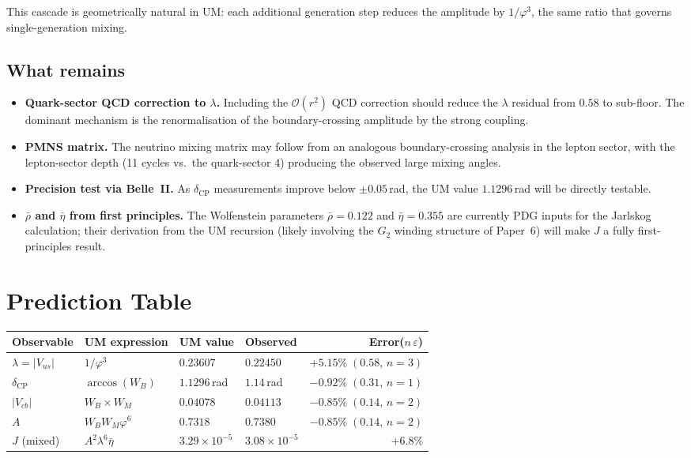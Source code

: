 \documentclass[12pt]{article}
\begin{document}
This cascade is geometrically natural in UM: each additional generation
step reduces the amplitude by $1/\varphi^3$, the same ratio that governs
single-generation mixing.

\subsection{What remains}

\begin{itemize}
  \item \textbf{Quark-sector QCD correction to $\lambda$.} Including the
        $\mathcal{O}(r^2)$ QCD correction should reduce the $\lambda$
        residual from $0.58$ to sub-floor. The dominant mechanism is the
        renormalisation of the boundary-crossing amplitude by the strong
        coupling.
  \item \textbf{PMNS matrix.} The neutrino mixing matrix may follow from
        an analogous boundary-crossing analysis in the lepton sector,
        with the lepton-sector depth (11 cycles vs.\ the quark-sector 4)
        producing the observed large mixing angles.
  \item \textbf{Precision test via Belle~II.} As $\delta_{\text{CP}}$
        measurements improve below $\pm 0.05$\,rad, the UM value
        $1.1296$\,rad will be directly testable.
  \item \textbf{$\bar\rho$ and $\bar\eta$ from first principles.} The
        Wolfenstein parameters $\bar\rho = 0.122$ and $\bar\eta = 0.355$
        are currently PDG inputs for the Jarlskog calculation; their
        derivation from the UM recursion (likely involving the $G_2$
        winding structure of Paper~6) will make $J$ a fully
        first-principles result.
\end{itemize}

\section{Prediction Table}

\begin{center}
{\color{gold}
\begin{tabular}{llllr}
\toprule
Observable & UM expression & UM value & Observed & Error\;($n\,\varepsilon$) \\
\midrule
$\lambda = |V_{us}|$
  & $1/\varphi^3$
  & $0.23607$ & $0.22450$ & $+5.15\%\;(0.58,\,n{=}3)$ \\
$\delta_{\text{CP}}$
  & $\arccos(W_B)$
  & $1.1296$\,rad & $1.14$\,rad & $-0.92\%\;(0.31,\,n{=}1)$ \\
$|V_{cb}|$
  & $W_B \times W_M$
  & $0.04078$ & $0.04113$ & $-0.85\%\;(0.14,\,n{=}2)$ \\
$A$
  & $W_B W_M \varphi^6$
  & $0.7318$ & $0.7380$ & $-0.85\%\;(0.14,\,n{=}2)$ \\
$J$ (mixed)
  & $A^2\lambda^6\bar\eta$
  & $3.29\times10^{-5}$ & $3.08\times10^{-5}$ & $+6.8\%$ \\
\bottomrule
\end{tabular}
}
\end{center}
\end{document}
